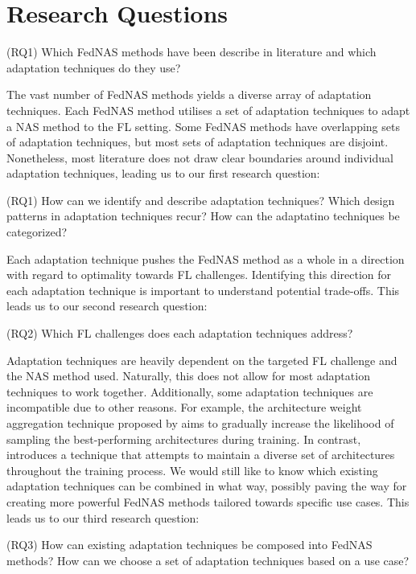 \section{Research Questions}

(RQ1) Which FedNAS methods have been describe in literature and which adaptation techniques do they use?

The vast number of FedNAS methods yields a diverse array of adaptation techniques. Each FedNAS method utilises a set of adaptation techniques to adapt a NAS method to the FL setting. Some FedNAS methods have overlapping sets of adaptation techniques, but most sets of adaptation techniques are disjoint. Nonetheless, most literature does not draw clear boundaries around individual adaptation techniques, leading us to our first research question:

\vspace{1em}
(RQ1) How can we identify and describe adaptation techniques? Which design patterns in adaptation techniques recur? How can the adaptatino techniques be categorized?
\vspace{1em}

Each adaptation technique pushes the FedNAS method as a whole in a direction with regard to optimality towards FL challenges. Identifying this direction for each adaptation technique is important to understand potential trade-offs. This leads us to our second research question:

\vspace{1em}
(RQ2) Which FL challenges does each adaptation techniques address?
\vspace{1em}

Adaptation techniques are heavily dependent on the targeted FL challenge and the NAS method used. Naturally, this does not allow for most adaptation techniques to work together. Additionally, some adaptation techniques are incompatible due to other reasons. For example, the architecture weight aggregation technique proposed by \cite{efnas_2024} aims to gradually increase the likelihood of sampling the best-performing architectures during training. In contrast, \cite{superfednas_2024} introduces a technique that attempts to maintain a diverse set of architectures throughout the training process. We would still like to know which existing adaptation techniques can be combined in what way, possibly paving the way for creating more powerful FedNAS methods tailored towards specific use cases. This leads us to our third research question:

\vspace{1em}
(RQ3) How can existing adaptation techniques be composed into FedNAS methods? How can we choose a set of adaptation techniques based on a use case?
\vspace{1em}

